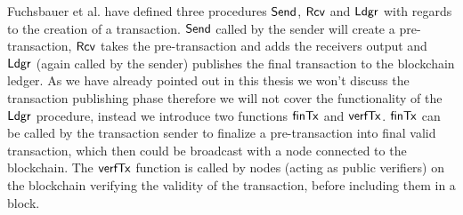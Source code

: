 Fuchsbauer et al. have defined three procedures $\mathsf{Send}$, $\mathsf{Rcv}$ and $\mathsf{Ldgr}$ with regards to the creation of a transaction. $\mathsf{Send}$ called by the sender
will create a pre-transaction, $\mathsf{Rcv}$ takes the pre-transaction and adds the receivers output and $\mathsf{Ldgr}$ (again called by the sender) publishes the final transaction to the blockchain ledger.
As we have already pointed out in this thesis we won't discuss the transaction publishing phase therefore we will not cover the functionality of the $\mathsf{Ldgr}$ procedure, instead we introduce two
functions $\mathsf{finTx}$ and $\mathsf{verfTx}$. $\mathsf{finTx}$ can be called by the transaction sender to finalize a pre-transaction into final valid transaction, which then could be broadcast with a node
connected to the blockchain. The $\mathsf{verfTx}$ function is called by nodes (acting as public verifiers) on the blockchain verifying the validity of the transaction, before including them in a block.

